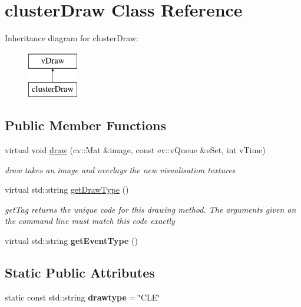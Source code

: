 \hypertarget{classclusterDraw}{}\section{cluster\+Draw Class Reference}
\label{classclusterDraw}
Inheritance diagram for cluster\+Draw\+:\begin{figure}[H]
\begin{center}
\leavevmode
\includegraphics[height=2.000000cm]{classclusterDraw}
\end{center}
\end{figure}
\subsection*{Public Member Functions}
\begin{DoxyCompactItemize}
\item 
virtual void \hyperlink{classclusterDraw_a4e76b182dc58c06d701e7d44a66de79c}{draw} (cv\+::\+Mat \&image, const ev\+::v\+Queue \&e\+Set, int v\+Time)
\begin{DoxyCompactList}\small\item\em draw takes an image and overlays the new visualisation textures \end{DoxyCompactList}\item 
virtual std\+::string \hyperlink{classclusterDraw_a1195b2532670913822405dbd8193e0d4}{get\+Draw\+Type} ()
\begin{DoxyCompactList}\small\item\em get\+Tag returns the unique code for this drawing method. The arguments given on the command line must match this code exactly \end{DoxyCompactList}\item 
virtual std\+::string {\bfseries get\+Event\+Type} ()\hypertarget{classclusterDraw_acec9468f4143e1efc323fa2da9958784}{}\label{classclusterDraw_acec9468f4143e1efc323fa2da9958784}

\end{DoxyCompactItemize}
\subsection*{Static Public Attributes}
\begin{DoxyCompactItemize}
\item 
static const std\+::string {\bfseries drawtype} = \char`\"{}C\+LE\char`\"{}\hypertarget{classclusterDraw_a3a1b70da319c636064f5f70c5e4e962d}{}\label{classclusterDraw_a3a1b70da319c636064f5f70c5e4e962d}

\end{DoxyCompactItemize}
